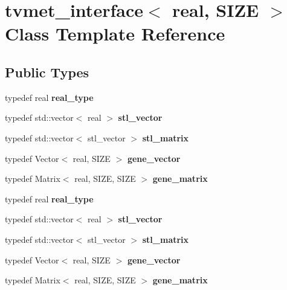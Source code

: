 \hypertarget{classtvmet__interface}{}\section{tvmet\+\_\+interface$<$ real, S\+I\+ZE $>$ Class Template Reference}
\label{classtvmet__interface}
\subsection*{Public Types}
\begin{DoxyCompactItemize}
\item 
\mbox{\label{classtvmet__interface_ae918a260a4973ea1b4332beb72d7274f}} 
typedef real {\bfseries real\+\_\+type}
\item 
\mbox{\label{classtvmet__interface_a342c4f3d36c4a45e547dd61eabd19774}} 
typedef std\+::vector$<$ real $>$ {\bfseries stl\+\_\+vector}
\item 
\mbox{\label{classtvmet__interface_aa5d74ccfc29279236df13ebafbd2374b}} 
typedef std\+::vector$<$ stl\+\_\+vector $>$ {\bfseries stl\+\_\+matrix}
\item 
\mbox{\label{classtvmet__interface_af062d18e9ec7fb2074729e91941dd85b}} 
typedef Vector$<$ real, S\+I\+ZE $>$ {\bfseries gene\+\_\+vector}
\item 
\mbox{\label{classtvmet__interface_ae802e372ee8eb6da0202c95581aff971}} 
typedef Matrix$<$ real, S\+I\+ZE, S\+I\+ZE $>$ {\bfseries gene\+\_\+matrix}
\item 
\mbox{\label{classtvmet__interface_ae918a260a4973ea1b4332beb72d7274f}} 
typedef real {\bfseries real\+\_\+type}
\item 
\mbox{\label{classtvmet__interface_a342c4f3d36c4a45e547dd61eabd19774}} 
typedef std\+::vector$<$ real $>$ {\bfseries stl\+\_\+vector}
\item 
\mbox{\label{classtvmet__interface_aa5d74ccfc29279236df13ebafbd2374b}} 
typedef std\+::vector$<$ stl\+\_\+vector $>$ {\bfseries stl\+\_\+matrix}
\item 
\mbox{\label{classtvmet__interface_af062d18e9ec7fb2074729e91941dd85b}} 
typedef Vector$<$ real, S\+I\+ZE $>$ {\bfseries gene\+\_\+vector}
\item 
\mbox{\label{classtvmet__interface_ae802e372ee8eb6da0202c95581aff971}} 
typedef Matrix$<$ real, S\+I\+ZE, S\+I\+ZE $>$ {\bfseries gene\+\_\+matrix}
\end{DoxyCompactItemize}
